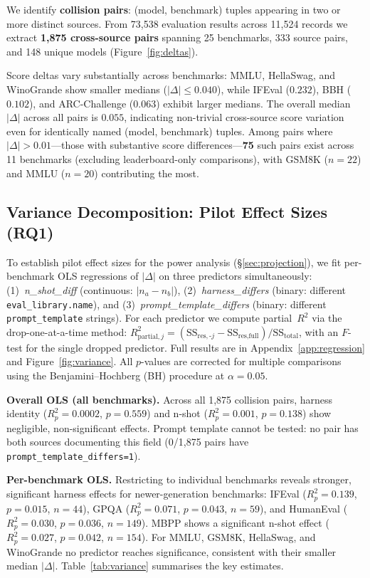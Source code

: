 \documentclass[11pt]{article}
\begin{document}
We identify \textbf{collision pairs}: (model, benchmark) tuples appearing
in two or more distinct sources.
From 73,538 evaluation results across 11,524 records we extract
\textbf{1,875 cross-source pairs} spanning
25 benchmarks, 333 source pairs, and 148 unique models
(Figure~\ref{fig:deltas}).

Score deltas vary substantially across benchmarks: MMLU, HellaSwag,
and WinoGrande show smaller medians ($|\Delta|\!\leq\!0.040$),
while IFEval ($0.232$), BBH ($0.102$), and ARC-Challenge ($0.063$)
exhibit larger medians.
The overall median $|\Delta|$ across all pairs is $0.055$,
indicating non-trivial cross-source score variation even for identically
named (model, benchmark) tuples.
Among pairs where $|\Delta| > 0.01$---those with substantive score
differences---\textbf{75} such pairs exist across 11 benchmarks
(excluding leaderboard-only comparisons), with
GSM8K ($n=22$) and MMLU ($n=20$) contributing the most.

\subsection{Variance Decomposition: Pilot Effect Sizes (RQ1)}
\label{sec:variance}

To establish pilot effect sizes for the power analysis
(\S\ref{sec:projection}), we fit per-benchmark OLS regressions of
$|\Delta|$ on three predictors simultaneously:
(1)~\emph{n\_shot\_diff} (continuous: $|n_a - n_b|$),
(2)~\emph{harness\_differs} (binary: different \texttt{eval\_library.name}),
and (3)~\emph{prompt\_template\_differs} (binary: different
\texttt{prompt\_template} strings).
For each predictor we compute partial~$R^2$ via the drop-one-at-a-time
method: $R^2_{\text{partial},j} = (\text{SS}_{\text{res},\text{-}j}
- \text{SS}_{\text{res},\text{full}}) / \text{SS}_{\text{total}}$,
with an $F$-test for the single dropped predictor.
Full results are in Appendix~\ref{app:regression} and
Figure~\ref{fig:variance}.
All $p$-values are corrected for multiple comparisons using the
Benjamini--Hochberg (BH) procedure at $\alpha = 0.05$.

\textbf{Overall OLS (all benchmarks).}
Across all 1,875 collision pairs, harness identity ($R^2_p = 0.0002$,
$p = 0.559$) and n-shot ($R^2_p = 0.001$, $p = 0.138$) show negligible,
non-significant effects.
Prompt template cannot be tested: no pair has both sources documenting
this field (0/1,875 pairs have \texttt{prompt\_template\_differs=1}).

\textbf{Per-benchmark OLS.}
Restricting to individual benchmarks reveals stronger, significant
harness effects for newer-generation benchmarks:
IFEval ($R^2_p = 0.139$, $p = 0.015$, $n = 44$),
GPQA ($R^2_p = 0.071$, $p = 0.043$, $n = 59$),
and HumanEval ($R^2_p = 0.030$, $p = 0.036$, $n = 149$).
MBPP shows a significant n-shot effect ($R^2_p = 0.027$, $p = 0.042$, $n = 154$).
For MMLU, GSM8K, HellaSwag, and WinoGrande no predictor
reaches significance, consistent with their smaller median $|\Delta|$.
Table~\ref{tab:variance} summarises the key estimates.
\end{document}
